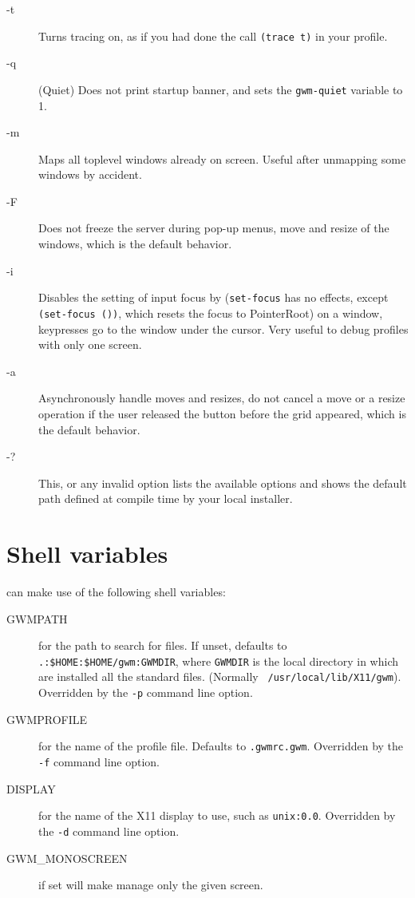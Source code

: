 \begin{description}
\item[-t] Turns tracing on, as if you had done the call \verb"(trace t)" in
your profile.

\item[-q] (Quiet) Does not print startup banner, and sets the {\WOOL}
\verb"gwm-quiet" variable to 1.

\item[-m] Maps all toplevel windows already on screen. Useful after
unmapping some windows by accident.

\item[-F] Does not freeze the server during pop-up menus, move and resize of
the windows, which is the default behavior.

\item[-i] Disables the setting of input focus by {\GWM} (\verb"set-focus"
has no effects, except \verb"(set-focus ())", which resets the focus to
PointerRoot) on a window, keypresses go to the window under the cursor. Very
useful to debug profiles with only one screen.

\item[-a] Asynchronously handle moves and resizes, do not cancel a
move or a resize operation if the user released the button before the grid
appeared, which is the default behavior.

\item[-?] This, or any invalid option lists the available options and shows the
default path defined at compile time by your local installer.

\end{description}

\section{Shell variables}

{\GWM} can make use of the following shell variables:

\begin{description}

\item[GWMPATH] \sloppy for the path to search for files. If unset, defaults to
\verb".:$HOME:$HOME/gwm:GWMDIR", where {\tt GWMDIR} is the local directory
in which are installed all the standard {\GWM} files. (Normally {\tt
/usr/local/lib/X11/gwm}). Overridden by the \verb"-p" command line option.

\item[GWMPROFILE] for the name of the profile file. Defaults to
\verb".gwmrc.gwm". Overridden by the \verb"-f" command line option.

\item[DISPLAY] for the name of the X11 display to use, such as
\verb"unix:0.0". Overridden by the \verb"-d" command line option.

\item[GWM\_MONOSCREEN] if set will make {\GWM} manage only the given screen.

\end{description}

